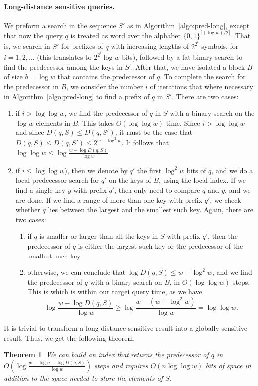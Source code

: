 \documentclass[a4paper,11pt]{article}
\newtheorem{theorem}{Theorem}[section]
\newcommand{\?}{\mskip1.5mu}
\begin{document}
\paragraph{Long-distance sensitive queries.}
We preform a search in the sequence $S'$ as in 
Algorithm~\ref{algo:pred-long},  except that now 
the query $q$ is treated as word over the 
alphabet $\{0, 1\}^{\lceil(\log w)/2\rceil}$. 
That is, we search in $S'$ for prefixes of $q$ with increasing
lengths of
$2^{2^i}$ symbols, for $i = 1, 2, \dots$ (this translates to 
$2^{2^i}\log w$ bits), 
followed by a fat binary search to find the predecessor 
among the keys in $S'$.
After that, we have isolated a block $B$ of size 
$b = \log w$ that contains the predecessor of $q$. 
To complete the search for the predecessor in
$B$, we consider the number $i$ of iterations
that where necessary in Algorithm~\ref{algo:pred-long} 
to find a prefix of $q$ in $S'$. There are two cases:
\begin{enumerate}
\item if $i > \log\log w$, we find the predecessor of $q$ in $S$
with a binary search on the $\log w$ elements in $B$. 
This takes $O(\log\log w)$ time. 
Since $i > \log\log w$ and since $D(q, S) \leq D(q, S')$, 
it must be the case that $D(q, S) \leq D(q, S') \leq 2^{w-\log^2 w}$. 
It follows that $\log\log w\leq \log\frac{w-\log D(q, S)}{\log w}$.
\item if $i \leq \log\log w$), then we
denote by $q'$ the first $\log^2 w$ bits of $q$, and we 
do a local predecessor search 
for $q'$ on the keys of $B$, using the local index. 
If we find a single key $y$ with prefix 
$q'$, then only need to compare $q$ and $y$, and we are done. 
If we find a range of more than one key with prefix
$q'$, we check whether $q$ lies between the largest 
and the smallest such key. Again, there are two cases:
\begin{enumerate}
\item if $q$ is smaller or larger than all the keys in $S$ 
with prefix $q'$,
then the predecessor of $q$ is either the largest such key
or the predecessor of the smallest such key.
\item otherwise, we can conclude that $\log D(q,S) \leq w-\log^2 w$, 
and we find the predecessor of $q$ with a binary search on $B$,
in $O(\log\log w)$ steps.  
This is which is within our target query time, 
as we have 
\[
\log\frac{w-\log D(q,S)}{\log w}\geq \log\frac{w-(w-\log^2w)}{\log w}
=\log\log w. 
\]
\end{enumerate}
\end{enumerate}
It is trivial to transform a long-distance sensitive result into a 
globally sensitive result. Thus, we get the following theorem. 
\begin{theorem}
\label{thm:pred-long2}
We can build an index that returns the predecessor of $q$
in $O(\log\frac{w-\log n-\log D(q,S)}{\log w})$ steps 
and requires $O(n \log\log w )$
bits of space in addition to the space needed to store the elements of $S$.
\end{theorem}
\end{document}
